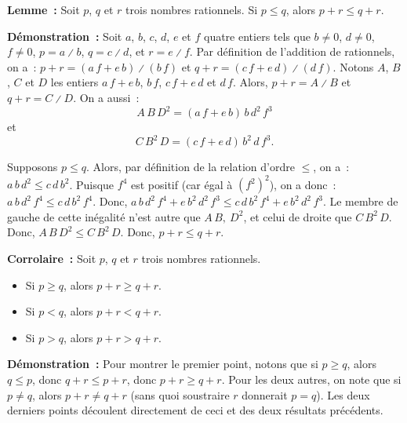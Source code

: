 \medskip

\noindent\textbf{Lemme :} Soit $p$, $q$ et $r$ trois nombres rationnels.
    Si $p \leq q$, alors $p + r \leq q + r$.

\medskip

\noindent\textbf{Démonstration :} 
    Soit $a$, $b$, $c$, $d$, $e$ et $f$ quatre entiers tels que $b \neq 0$, $d \neq 0$, $f \neq 0$, $p = a \divslash b$, $q = c \divslash d$, et $r = e \divslash f$.
    Par définition de l'addition de rationnels, on a : $p + r = (a \, f + e \, b) \divslash (b \, f)$ et $q + r = (c \, f + e \, d) \divslash (d \, f)$.
    Notons $A$, $B$, $C$ et $D$ les entiers $a \, f + e \, b$, $b \, f$, $c \, f + e \, d$ et $d \, f$. 
    Alors, $p + r = A \divslash B$ et $q + r = C \divslash D$.
    On a aussi : 
    \begin{equation*}
        A \, B \, D^2 = (a \, f + e \, b) \, b \, d^2 \, f^3
    \end{equation*}
    et 
    \begin{equation*}
        C \, B^2 \, D = (c \, f + e \, d) \, b^2 \, d \, f^3.
    \end{equation*}

    Supposons $p \leq q$.
    Alors, par définition de la relation d'ordre $\leq$, on a : $a \, b \, d^2 \leq c \, d \, b^2$. 
    Puisque $f^4$ est positif (car égal à $(f^2)^2$), on a donc : $a \, b \, d^2 \, f^4 \leq c \, d \, b^2 \, f^4$.
    Donc, $a \, b \, d^2 \, f^4 + e \, b^2 \, d^2 \, f^3 \leq c \, d \, b^2 \, f^4 + e \, b^2 \, d^2 \, f^3$.
    Le membre de gauche de cette inégalité n'est autre que $A \, B ,\ D^2$, et celui de droite que $C \, B^2 \, D$.
    Donc, $A \, B \, D^2 \leq C \, B^2 \, D$.
    Donc, $p + r \leq q + r$.

    \done

\medskip

\noindent\textbf{Corrolaire :} Soit $p$, $q$ et $r$ trois nombres rationnels.
    \begin{itemize}[nosep]
        \item Si $p \geq q$, alors $p + r \geq q + r$.
        \item Si $p < q$, alors $p + r < q + r$.
        \item Si $p > q$, alors $p + r > q + r$.
    \end{itemize}

\medskip

\noindent\textbf{Démonstration :} 
    Pour montrer le premier point, notons que si $p \geq q$, alors $q \leq p$, donc $q + r \leq p + r$, donc $p + r \geq q + r$.
    Pour les deux autres, on note que si $p \neq q$, alors $p + r \neq q + r$ (sans quoi soustraire $r$ donnerait $p = q$). 
    Les deux derniers points découlent directement de ceci et des deux résultats précédents.


